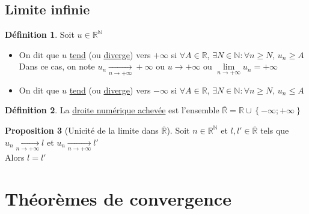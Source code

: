 \documentclass[10pt,a4paper]{article}
\theoremstyle{definition}
\newtheorem{proposition}{Proposition}[section]
\newtheorem{definition}[proposition]{Définition}
\begin{document}
\subsection{Limite infinie}
\begin{definition}
Soit $u \in \mathbb{R}^\mathbb{N}$
\begin{itemize}
\item On dit que $u$ \uline{tend} (ou \uline{diverge}) vers $+\infty$ si $\forall A \in \mathbb{R}$, $\exists N \in \mathbb{N}: \forall n \geq N$, $u_n \geq A$ \\
Dans ce cas, on note $u_n \xrightarrow[n \to +\infty]{} +\infty$ ou $u \to +\infty$ ou $\lim\limits_{n \to +\infty} u_n = +\infty$
\item On dit que $u$ \uline{tend} (ou \uline{diverge}) vers $-\infty$ si $\forall A \in \mathbb{R}$, $\exists N \in \mathbb{N}: \forall n \geq N$, $u_n \leq A$
\end{itemize}
\end{definition}
\begin{definition}
La \uline{droite numérique achevée} est l'ensemble $\overline{\mathbb{R}} = \mathbb{R} \cup \left\{ -\infty; +\infty \right\}$
\end{definition}
\begin{proposition}[Unicité de la limite dans $\overline{\mathbb{R}}$]
Soit $n \in \mathbb{R}^\mathbb{N}$ et $l, l' \in \overline{\mathbb{R}}$ tels que $u_n \xrightarrow[n \to +\infty]{} l$ et $u_n \xrightarrow[n \to +\infty]{} l'$ \\
Alors $l = l'$
\end{proposition}

\section{Théorèmes de convergence}
\end{document}
